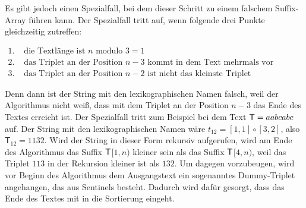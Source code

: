 Es gibt jedoch einen Spezialfall, bei dem dieser Schritt zu einem falschem Suffix-Array führen kann. Der Spezialfall tritt auf, wenn folgende drei Punkte gleichzeitig zutreffen:

$\begin{array}{ll}
1. & \text{ die Textlänge ist } n \text{ modulo } 3 = 1\\ 
2. & \text{ das Triplet an der Position } n - 3 \text{ kommt in dem Text mehrmals vor}\\ 
3. & \text{ das Triplet an der Position } n - 2 \text{ ist nicht das kleinste Triplet}
\end{array}$

Denn dann ist der String mit den lexikographischen Namen falsch, weil der Algorithmus nicht weiß, dass mit dem Triplet an der Position $n - 3$ das Ende des Textes erreicht ist.
Der Spezialfall tritt zum Beispiel bei dem Text $\inputtext = aabcabc$ auf. Der String mit den lexikographischen Namen wäre $t_{12} = [1, 1] \circ [3, 2]$, also $\mathsf{T}_{12} = 1132$. Wird der String in dieser Form rekursiv aufgerufen, wird am Ende des Algorithmus das Suffix $\inputtext$$[1, n)$ kleiner sein als das Suffix $\inputtext$$[4, n)$, weil das Triplet $113$ in der Rekursion kleiner ist als $132$. Um dagegen vorzubeugen, wird vor Beginn des Algorithmus dem Ausgangstext ein sogenanntes Dummy-Triplet angehangen, das aus Sentinels besteht. Dadurch wird dafür gesorgt, dass das Ende des Textes mit in die Sortierung eingeht.